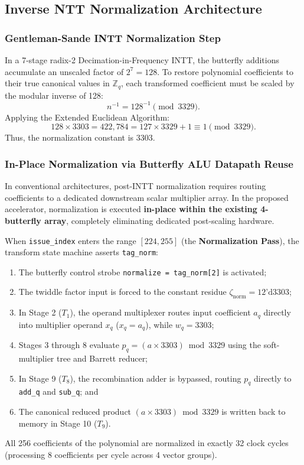 \subsection{Inverse NTT Normalization Architecture}
\label{sec:intt_norm}

\subsubsection{Gentleman-Sande INTT Normalization Step}
In a 7-stage radix-2 Decimation-in-Frequency INTT, the butterfly additions accumulate an unscaled factor of $2^7 = 128$. To restore polynomial coefficients to their true canonical values in $\mathbb{Z}_q$, each transformed coefficient must be scaled by the modular inverse of 128:
\begin{equation}
\label{eq:inv128_def}
n^{-1} = 128^{-1} \pmod{3329}.
\end{equation}
Applying the Extended Euclidean Algorithm:
\begin{equation}
\label{eq:inv128_calc_math}
128 \times 3303 = 422,784 = 127 \times 3329 + 1 \equiv 1 \pmod{3329}.
\end{equation}
Thus, the normalization constant is $3303$.

\subsubsection{In-Place Normalization via Butterfly ALU Datapath Reuse}
In conventional architectures, post-INTT normalization requires routing coefficients to a dedicated downstream scalar multiplier array. In the proposed accelerator, normalization is executed \textbf{in-place within the existing 4-butterfly array}, completely eliminating dedicated post-scaling hardware.

When \texttt{issue\_index} enters the range $[224, 255]$ (the \textbf{Normalization Pass}), the transform state machine asserts \texttt{tag\_norm}:
\begin{enumerate}
    \item The butterfly control strobe \texttt{normalize = tag\_norm[2]} is activated;
    \item The twiddle factor input is forced to the constant residue $\zeta_{\text{norm}} = 12\text{'d}3303$;
    \item In Stage 2 ($T_1$), the operand multiplexer routes input coefficient $a_q$ directly into multiplier operand $x_q$ ($x_q = a_q$), while $w_q = 3303$;
    \item Stages 3 through 8 evaluate $p_q = (a \times 3303) \bmod 3329$ using the soft-multiplier tree and Barrett reducer;
    \item In Stage 9 ($T_8$), the recombination adder is bypassed, routing $p_q$ directly to \texttt{add\_q} and \texttt{sub\_q}; and
    \item The canonical reduced product $(a \times 3303) \bmod 3329$ is written back to memory in Stage 10 ($T_9$).
\end{enumerate}
All 256 coefficients of the polynomial are normalized in exactly 32 clock cycles (processing 8 coefficients per cycle across 4 vector groups).

